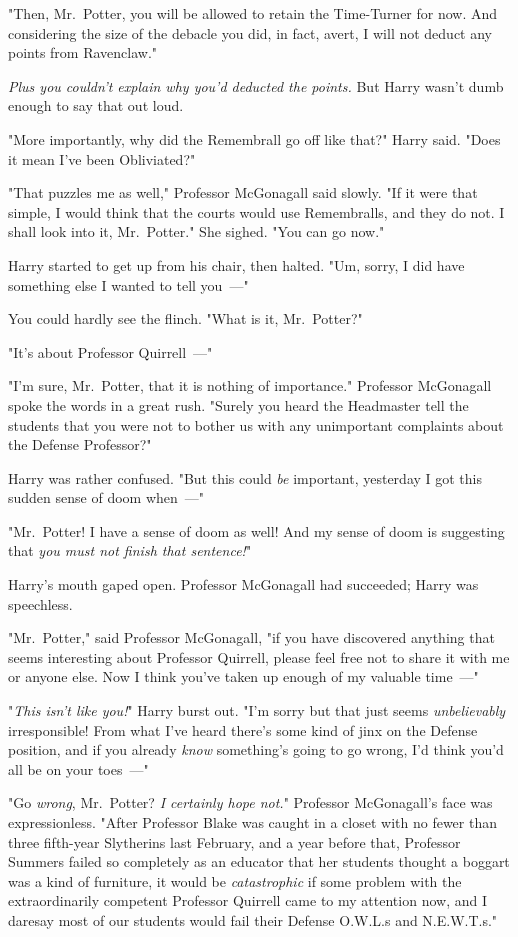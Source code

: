 "Then, Mr.~Potter, you will be allowed to retain the Time-Turner for now. And
considering the size of the debacle you did, in fact, avert, I will not deduct
any points from Ravenclaw."

\emph{Plus you couldn't explain why you'd deducted the points.} But Harry
wasn't dumb enough to say that out loud.

"More importantly, why did the Remembrall go off like that?" Harry said. "Does
it mean I've been Obliviated?"

"That puzzles me as well," Professor McGonagall said slowly. "If it were that
simple, I would think that the courts would use Remembralls, and they do not. I
shall look into it, Mr.~Potter." She sighed. "You can go now."

Harry started to get up from his chair, then halted. "Um, sorry, I did have
something else I wanted to tell you~---"

You could hardly see the flinch. "What is it, Mr.~Potter?"

"It's about Professor Quirrell~---"

"I'm sure, Mr.~Potter, that it is nothing of importance." Professor McGonagall
spoke the words in a great rush. "Surely you heard the Headmaster tell the
students that you were not to bother us with any unimportant complaints about
the Defense Professor?"

Harry was rather confused. "But this could \emph{be} important, yesterday I got
this sudden sense of doom when~---"

"Mr.~Potter! I have a sense of doom as well! And my sense of doom is suggesting
that \emph{you must not finish that sentence!}"

Harry's mouth gaped open. Professor McGonagall had succeeded; Harry was
speechless.

"Mr.~Potter," said Professor McGonagall, "if you have discovered anything that
seems interesting about Professor Quirrell, please feel free not to share it
with me or anyone else. Now I think you've taken up enough of my valuable
time~---"

"\emph{This isn't like you!}" Harry burst out. "I'm sorry but that just seems
\emph{unbelievably} irresponsible! From what I've heard there's some kind of
jinx on the Defense position, and if you already \emph{know} something's going
to go wrong, I'd think you'd all be on your toes~---"

"Go \emph{wrong}, Mr.~Potter? \emph{I certainly hope not.}" Professor
McGonagall's face was expressionless. "After Professor Blake was caught in a
closet with no fewer than three fifth-year Slytherins last February, and a year
before that, Professor Summers failed so completely as an educator that her
students thought a boggart was a kind of furniture, it would be
\emph{catastrophic} if some problem with the extraordinarily competent
Professor Quirrell came to my attention now, and I daresay most of our students
would fail their Defense O.W.L.s and N.E.W.T.s."

